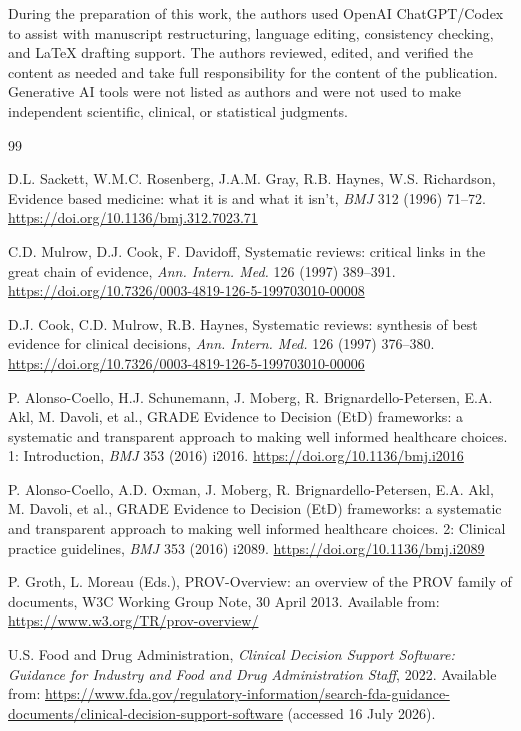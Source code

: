 \documentclass[11pt,a4paper]{article}
\begin{document}
During the preparation of this work, the authors used OpenAI ChatGPT/Codex to assist with manuscript restructuring, language editing, consistency checking, and LaTeX drafting support. The authors reviewed, edited, and verified the content as needed and take full responsibility for the content of the publication. Generative AI tools were not listed as authors and were not used to make independent scientific, clinical, or statistical judgments.

\begin{thebibliography}{99}

D.L. Sackett, W.M.C. Rosenberg, J.A.M. Gray, R.B. Haynes, W.S. Richardson, Evidence based medicine: what it is and what it isn't, \emph{BMJ} 312 (1996) 71--72. \url{https://doi.org/10.1136/bmj.312.7023.71}

C.D. Mulrow, D.J. Cook, F. Davidoff, Systematic reviews: critical links in the great chain of evidence, \emph{Ann. Intern. Med.} 126 (1997) 389--391. \url{https://doi.org/10.7326/0003-4819-126-5-199703010-00008}

D.J. Cook, C.D. Mulrow, R.B. Haynes, Systematic reviews: synthesis of best evidence for clinical decisions, \emph{Ann. Intern. Med.} 126 (1997) 376--380. \url{https://doi.org/10.7326/0003-4819-126-5-199703010-00006}

P. Alonso-Coello, H.J. Schunemann, J. Moberg, R. Brignardello-Petersen, E.A. Akl, M. Davoli, et al., GRADE Evidence to Decision (EtD) frameworks: a systematic and transparent approach to making well informed healthcare choices. 1: Introduction, \emph{BMJ} 353 (2016) i2016. \url{https://doi.org/10.1136/bmj.i2016}

P. Alonso-Coello, A.D. Oxman, J. Moberg, R. Brignardello-Petersen, E.A. Akl, M. Davoli, et al., GRADE Evidence to Decision (EtD) frameworks: a systematic and transparent approach to making well informed healthcare choices. 2: Clinical practice guidelines, \emph{BMJ} 353 (2016) i2089. \url{https://doi.org/10.1136/bmj.i2089}

P. Groth, L. Moreau (Eds.), PROV-Overview: an overview of the PROV family of documents, W3C Working Group Note, 30 April 2013. Available from: \url{https://www.w3.org/TR/prov-overview/}

U.S. Food and Drug Administration, \emph{Clinical Decision Support Software: Guidance for Industry and Food and Drug Administration Staff}, 2022. Available from: \url{https://www.fda.gov/regulatory-information/search-fda-guidance-documents/clinical-decision-support-software} (accessed 16 July 2026).


\end{thebibliography}
\end{document}
